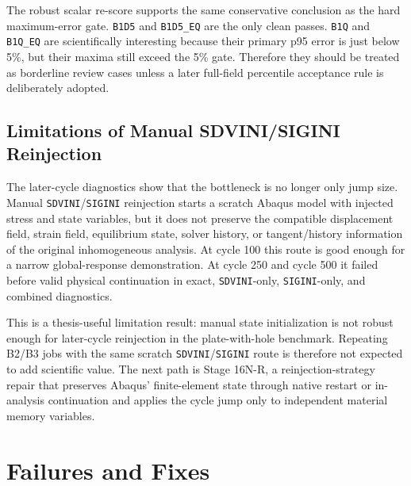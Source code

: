 \documentclass[11pt,a4paper]{article}
\newcommand{\code}[1]{\texttt{#1}}
\begin{document}
The robust scalar re-score supports the same conservative conclusion as the hard maximum-error gate. \code{B1D5} and \code{B1D5\_EQ} are the only clean passes. \code{B1Q} and \code{B1Q\_EQ} are scientifically interesting because their primary p95 error is just below 5\%, but their maxima still exceed the 5\% gate. Therefore they should be treated as borderline review cases unless a later full-field percentile acceptance rule is deliberately adopted.

\subsection{Limitations of Manual SDVINI/SIGINI Reinjection}

The later-cycle diagnostics show that the bottleneck is no longer only jump size. Manual \code{SDVINI}/\code{SIGINI} reinjection starts a scratch Abaqus model with injected stress and state variables, but it does not preserve the compatible displacement field, strain field, equilibrium state, solver history, or tangent/history information of the original inhomogeneous analysis. At cycle 100 this route is good enough for a narrow global-response demonstration. At cycle 250 and cycle 500 it failed before valid physical continuation in exact, \code{SDVINI}-only, \code{SIGINI}-only, and combined diagnostics.

This is a thesis-useful limitation result: manual state initialization is not robust enough for later-cycle reinjection in the plate-with-hole benchmark. Repeating B2/B3 jobs with the same scratch \code{SDVINI}/\code{SIGINI} route is therefore not expected to add scientific value. The next path is Stage 16N-R, a reinjection-strategy repair that preserves Abaqus' finite-element state through native restart or in-analysis continuation and applies the cycle jump only to independent material memory variables.

\section{Failures and Fixes}
\end{document}
